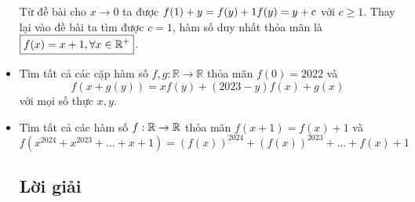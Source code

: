 \documentclass[11pt]{scrartcl}
\begin{document}
\begin{itemize}[label=, leftmargin=0em, itemsep=0.5em]
\begin{sol}
        Từ đề bài cho $x \to 0$ ta được $f(1) + y = f(y) + 1 \ra f(y) = y + c$ với $c \geq 1$. Thay lại vào đề bài ta tìm được $c = 1$, hàm số duy nhất thỏa mãn là $\boxed{f(x) = x + 1, \forall x\in \mathbb{R^+}}$.
    \end{sol}
    \begin{comment}
    \item \begin{btvn}\vocab{(Đồng Tháp TST 2023).}
        Tìm tất cả các hàm số $f: \mathbb{R} \to \mathbb{R}$ thỏa mãn
        \[
            f(x + y) + f(x - y) - 2f(x)f(y + 1) = xy
        \]
        với mọi số thực $x,y$.
    \end{btvn}
    \item \begin{btvn}\vocab{(Bình Phước TST 2023).}
        Tìm tất cả các hàm số $f: \mathbb{R} \to \mathbb{R}$ thỏa mãn
        \[
            f(xf(x) + f(y)) = f(x)^2 + y
        \]
        với mọi số thực $x,y$.
    \end{btvn}
    \item \begin{btvn}\vocab{(An Giang TST 2023).}
        Tìm tất cả các hàm số $f: \mathbb{R} \to \mathbb{R}$ thỏa mãn
        \[
            f(x^2 + f(y)) = y + f(x)^2
        \]
        với mọi số thực $x,y$.
    \end{btvn}
    \end{comment}

    \item \begin{btvn} Tìm tất cả các cặp hàm số $f,g:\mathbb{R} \to \mathbb{R}$ thỏa mãn $f(0) = 2022$ và
        \[f (x+g(y)) =xf(y)+(2023-y)f(x)+g(x)\]
    với mọi số thực $x,y$.
    \end{btvn}
    \item \begin{btvn}
        Tìm tất cả các hàm số $f: \mathbb{R} \to \mathbb{R}$ thỏa mãn $f(x + 1) =f(x) + 1$ và
        \[
            f(x^{2024} + x^{2023} + \dots + x + 1) = (f(x))^{2024} + (f(x))^{2023} + \dots + f(x) + 1
        \]
    \end{btvn}

    \subsection{\LARGE \textcolor{dk}{Lời giải}}
    
\end{itemize}
\end{document}
